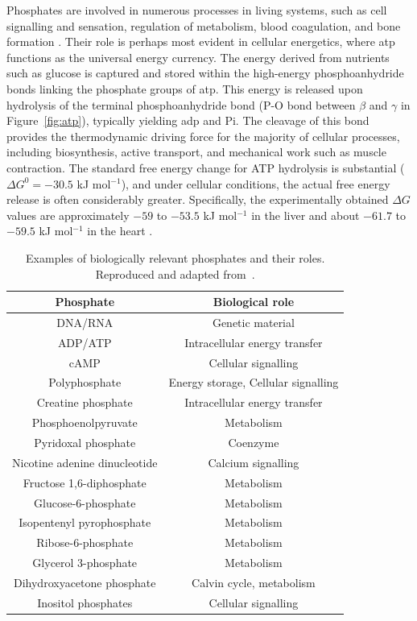 Phosphates are involved in numerous processes in living systems, such as cell signalling and sensation, regulation of metabolism, blood coagulation, and bone formation \citep{mullerInorganicPolyphosphatesStorage2019, nebesnayaInorganicPolyphosphateRegulates2024}. Their role is perhaps most evident in cellular energetics, where \ac{atp} functions as the universal energy currency. The energy derived from nutrients such as glucose is captured and stored within the high-energy phosphoanhydride bonds linking the phosphate groups of \ac{atp}. This energy is released upon hydrolysis of the terminal phosphoanhydride bond (P-O bond between $\beta$ and $\gamma$ in Figure~\ref{fig:atp}), typically yielding \ac{adp} and \ac{Pi}. The cleavage of this bond provides the thermodynamic driving force for the majority of cellular processes, including biosynthesis, active transport, and mechanical work such as muscle contraction. The standard free energy change for ATP hydrolysis is substantial ($\Delta G^{0}=-30.5$ kJ mol$^{-1}$), and under cellular conditions, the actual free energy release is often considerably greater. Specifically, the experimentally obtained $\Delta G$ values are approximately $-59$ to $-53.5$ kJ mol$^{-1}$ in the liver and about $-61.7$ to $-59.5$ kJ mol$^{-1}$ in the heart \citep{mullerInorganicPolyphosphatesStorage2019}.

\begin{table}[b!]
    \centering
    \begin{tabular}{cc}
    \toprule
    \textbf{Phosphate} & \textbf{Biological role} \\ 
    \midrule
    DNA/RNA & Genetic material \\
    ADP/ATP & Intracellular energy transfer \\
    cAMP & Cellular signalling \\
    Polyphosphate & Energy storage, Cellular signalling \\
    Creatine phosphate & Intracellular energy transfer \\
    Phosphoenolpyruvate & Metabolism \\
    Pyridoxal phosphate & Coenzyme \\
    Nicotine adenine dinucleotide & Calcium signalling \\
    Fructose 1,6-diphosphate & Metabolism \\
    Glucose-6-phosphate & Metabolism \\
    Isopentenyl pyrophosphate & Metabolism \\
    Ribose-6-phosphate & Metabolism \\
    Glycerol 3-phosphate & Metabolism \\
    Dihydroxyacetone phosphate & Calvin cycle, metabolism \\
    Inositol phosphates & Cellular signalling \\
    \bottomrule
    \end{tabular}
    \caption{Examples of biologically relevant phosphates and their roles. Reproduced and adapted from~\citep{kamerlinWhyNatureReally2013}.}
    \label{tab:role_of_phosphates}
\end{table}

